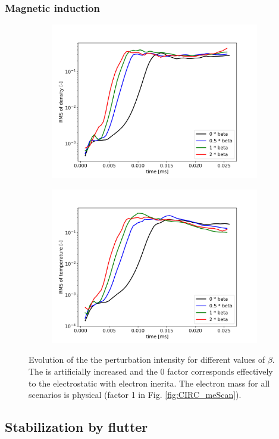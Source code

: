 \subsubsection{Magnetic induction}

\begin{figure}[H]\centering
	\begin{subfigure}[t]{0.45\textwidth}
		\centering
		\includegraphics[width=1\textwidth]{schemes/RMSn_betaScan.jpg}
	\end{subfigure}
	\begin{subfigure}[t]{0.45\textwidth}
		\centering
		\includegraphics[width=1\textwidth]{schemes/RMST_betaScan.jpg}
	\end{subfigure}
	\caption{Evolution of the the perturbation intensity for different values of $\beta$. The  is artificially increased and the 0 factor corresponds effectively to the electrostatic with electron inerita. The electron mass for all scenarios is physical (factor 1 in Fig. \ref{fig:CIRC_meScan}).}
	\label{fig:CIRC_betaScan}
\end{figure}



\subsection{Stabilization by flutter}







